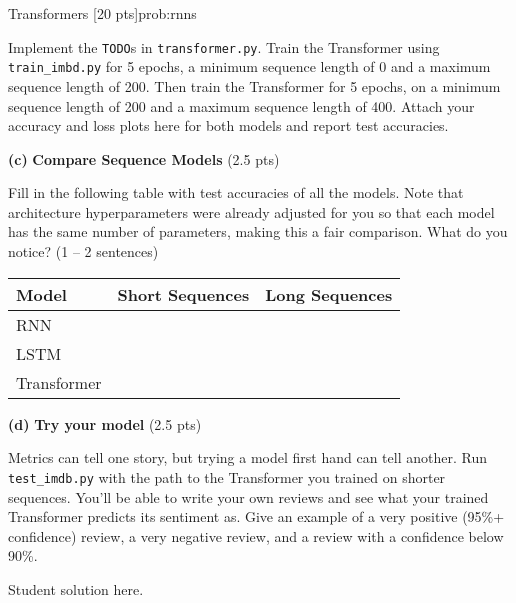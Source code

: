 \begin{problem}{Transformers \hfill [20 pts]}{prob:rnns}
\begin{adjustwidth}{2em}{2em}
\begin{adjustwidth}{2em}{2em}
    Implement the \texttt{TODO}s in \texttt{transformer.py}. Train the Transformer using \texttt{train\_imbd.py} for 5 epochs, a minimum sequence length of 0 and a maximum sequence length of 200. Then train the Transformer for 5 epochs, on a minimum sequence length of 200 and a maximum sequence length of 400. Attach your accuracy and loss plots here for both models and report test accuracies.
        \end{adjustwidth} 

        \vspace{5px}

    \textbf{(c)} \textbf{Compare Sequence Models} \hfill (2.5 pts)
    \begin{adjustwidth}{2em}{2em}
        Fill in the following table with test accuracies of all the models. Note that architecture hyperparameters were already adjusted for you so that each model has the same number of parameters, making this a fair comparison. What do you notice? (1 -- 2 sentences)

        \begin{center}
            \begin{tabular}{|l|c|c|}
            \hline
            \textbf{Model}     & \textbf{Short Sequences} & \textbf{Long Sequences} \\
            \hline
            RNN        &   &   \\
            \hline
            LSTM       &   &   \\
            \hline
            Transformer &   &   \\
            \hline
        \end{tabular}
    \end{center}

    \end{adjustwidth} 
    \vspace{5px}

    \textbf{(d)} \textbf{Try your model} \hfill (2.5 pts)
    \begin{adjustwidth}{2em}{2em}

    Metrics can tell one story, but trying a model first hand can tell another. Run \texttt{test\_imdb.py} with the path to the Transformer you trained on shorter sequences. You'll be able to write your own reviews and see what your trained Transformer predicts its sentiment as. Give an example of a very positive (95\%+ confidence) review, a very negative review, and a review with a confidence below 90\%.
        
    \end{adjustwidth} 
    \vspace{5px}
\end{adjustwidth}

\end{problem}

\begin{solution*}{}{}
Student solution here.
\end{solution*}